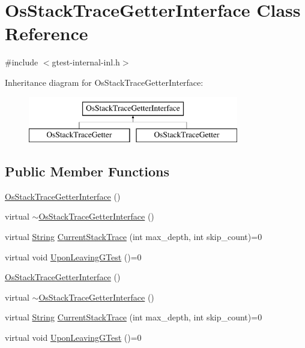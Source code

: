 \hypertarget{classtesting_1_1internal_1_1OsStackTraceGetterInterface}{\section{\-Os\-Stack\-Trace\-Getter\-Interface \-Class \-Reference}
\label{da/ddd/classtesting_1_1internal_1_1OsStackTraceGetterInterface}
}


{\ttfamily \#include $<$gtest-\/internal-\/inl.\-h$>$}

\-Inheritance diagram for \-Os\-Stack\-Trace\-Getter\-Interface\-:\begin{figure}[H]
\begin{center}
\leavevmode
\includegraphics[height=2.000000cm]{da/ddd/classtesting_1_1internal_1_1OsStackTraceGetterInterface}
\end{center}
\end{figure}
\subsection*{\-Public \-Member \-Functions}
\begin{DoxyCompactItemize}
\item 
\hyperlink{classtesting_1_1internal_1_1OsStackTraceGetterInterface_a96112db17481a175fa27543fb7236980}{\-Os\-Stack\-Trace\-Getter\-Interface} ()
\item 
virtual \hyperlink{classtesting_1_1internal_1_1OsStackTraceGetterInterface_a60683dbb0a51a92f07d1defc702ef21b}{$\sim$\-Os\-Stack\-Trace\-Getter\-Interface} ()
\item 
virtual \hyperlink{classtesting_1_1internal_1_1String}{\-String} \hyperlink{classtesting_1_1internal_1_1OsStackTraceGetterInterface_a5c5288a3dc07be69242eb5c6d3a02a2b}{\-Current\-Stack\-Trace} (int max\-\_\-depth, int skip\-\_\-count)=0
\item 
virtual void \hyperlink{classtesting_1_1internal_1_1OsStackTraceGetterInterface_a62a522fb4e6a18ae9a8799d1cd0b8bc6}{\-Upon\-Leaving\-G\-Test} ()=0
\item 
\hyperlink{classtesting_1_1internal_1_1OsStackTraceGetterInterface_a96112db17481a175fa27543fb7236980}{\-Os\-Stack\-Trace\-Getter\-Interface} ()
\item 
virtual \hyperlink{classtesting_1_1internal_1_1OsStackTraceGetterInterface_a60683dbb0a51a92f07d1defc702ef21b}{$\sim$\-Os\-Stack\-Trace\-Getter\-Interface} ()
\item 
virtual \hyperlink{classtesting_1_1internal_1_1String}{\-String} \hyperlink{classtesting_1_1internal_1_1OsStackTraceGetterInterface_a5c5288a3dc07be69242eb5c6d3a02a2b}{\-Current\-Stack\-Trace} (int max\-\_\-depth, int skip\-\_\-count)=0
\item 
virtual void \hyperlink{classtesting_1_1internal_1_1OsStackTraceGetterInterface_a62a522fb4e6a18ae9a8799d1cd0b8bc6}{\-Upon\-Leaving\-G\-Test} ()=0
\end{DoxyCompactItemize}
